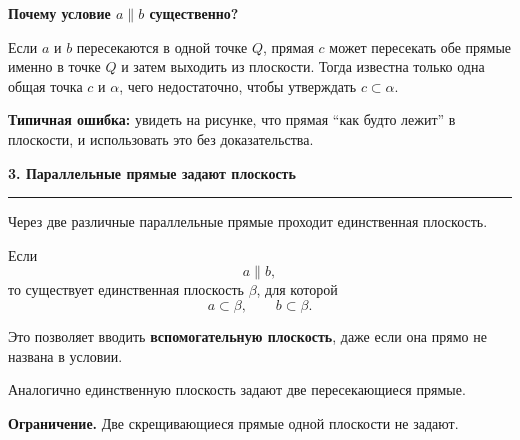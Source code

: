 \documentclass[a4paper,12pt]{article}
\newcommand{\lessonsection}[1]{%
  \vspace{0.4em}
  {\Large\bfseries\color{darkaccent}#1}\par
  \vspace{0.25em}
  {\color{lightaccent}\rule{\linewidth}{0.8pt}}
  \vspace{0.6em}
}
\newcommand{\key}[1]{\textbf{\color{darkaccent}#1}}
\begin{document}
\begin{center}
\end{center}

\key{Почему условие \(a\parallel b\) существенно?}

Если \(a\) и \(b\) пересекаются в одной точке \(Q\), прямая \(c\) может
пересекать обе прямые именно в точке \(Q\) и затем выходить из плоскости.
Тогда известна только одна общая точка \(c\) и \(\alpha\), чего недостаточно,
чтобы утверждать \(c\subset\alpha\).

\medskip

\key{Типичная ошибка:}
увидеть на рисунке, что прямая ``как будто лежит'' в плоскости, и использовать
это без доказательства.

\lessonsection{3. Параллельные прямые задают плоскость}

Через две различные параллельные прямые проходит единственная плоскость.

Если
\[
a\parallel b,
\]
то существует единственная плоскость \(\beta\), для которой
\[
a\subset\beta,\qquad b\subset\beta.
\]

Это позволяет вводить \key{вспомогательную плоскость}, даже если она прямо
не названа в условии.

Аналогично единственную плоскость задают две пересекающиеся прямые.

\medskip

\key{Ограничение.}
Две скрещивающиеся прямые одной плоскости не задают.
\end{document}

